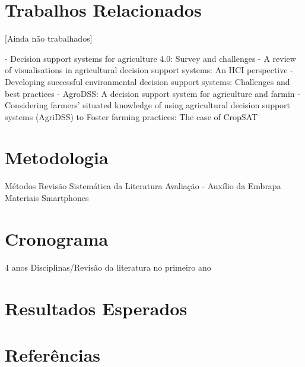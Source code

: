 \documentclass[12pt]{article}
\begin{document}
\section{Trabalhos Relacionados}

[Ainda não trabalhados]

- Decision support systems for agriculture 4.0: Survey and challenges
- A review of visualisations in agricultural decision support systems: An HCI perspective
- Developing successful environmental decision support systems: Challenges and best practices
- AgroDSS: A decision support system for agriculture and farmin
- Considering farmers' situated knowledge of using agricultural decision support systems (AgriDSS) to Foster farming practices: The case of CropSAT 

\section{Metodologia}
	Métodos
		Revisão Sistemática da Literatura
		Avaliação - Auxílio da Embrapa
	Materiais
		Smartphones

\section{Cronograma}

4 anos
Disciplinas/Revisão da literatura no primeiro ano

\section{Resultados Esperados}

\section{Referências}



\end{document}
